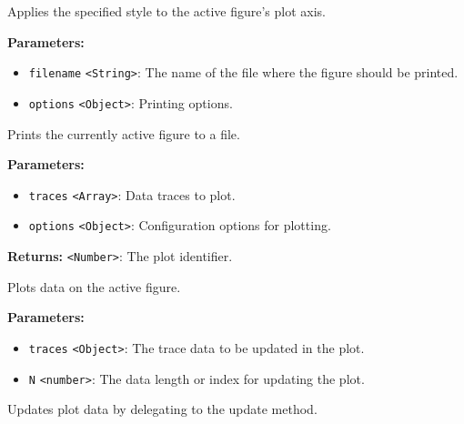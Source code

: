 \documentclass[12pt,a4paper]{article}
\begin{document}
\noindent Applies the specified style to the active figure's plot axis.

\vspace{5mm}
\noindent {}


\noindent \textbf{Parameters:}
\begin{itemize}
  \item \texttt{filename} \texttt{<String>}: The name of the file where the figure should be printed.
  \item \texttt{options} \texttt{<Object>}: Printing options.
\end{itemize}

\noindent Prints the currently active figure to a file.

\vspace{5mm}
\noindent {}


\noindent \textbf{Parameters:}
\begin{itemize}
  \item \texttt{traces} \texttt{<Array>}: Data traces to plot.
  \item \texttt{options} \texttt{<Object>}: Configuration options for plotting.
\end{itemize}

\noindent \textbf{Returns:} \texttt{<Number>}: The plot identifier.

\noindent Plots data on the active figure.

\vspace{5mm}
\noindent {}


\noindent \textbf{Parameters:}
\begin{itemize}
  \item \texttt{traces} \texttt{<Object>}: The trace data to be updated in the plot.
  \item \texttt{N} \texttt{<number>}: The data length or index for updating the plot.
\end{itemize}

\noindent Updates plot data by delegating to the \textasciigrave{}update\textasciigrave{} method.
\end{document}
